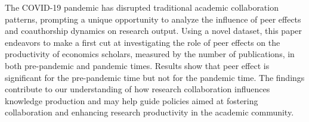 The COVID-19 pandemic has disrupted traditional academic collaboration patterns, prompting a unique opportunity to analyze the influence of peer effects and coauthorship dynamics on research output. Using a novel dataset, this paper endeavors to make a first cut at investigating the role of peer effects on the productivity of economics scholars, measured by the number of publications, in both pre-pandemic and pandemic times. Results show that peer effect is significant for the pre-pandemic time but not for the pandemic time. The findings contribute to our understanding of how research collaboration influences knowledge production and may help guide policies aimed at fostering collaboration and enhancing research productivity in the academic community.